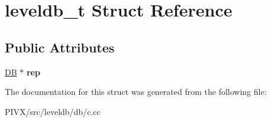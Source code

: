 \hypertarget{structleveldb__t}{}\section{leveldb\+\_\+t Struct Reference}
\label{structleveldb__t}
\subsection*{Public Attributes}
\begin{DoxyCompactItemize}
\item 
\mbox{\label{structleveldb__t_af8f1950b2c676ccc37e4095f558261ad}} 
\mbox{\hyperlink{classleveldb_1_1_d_b}{DB}} $\ast$ {\bfseries rep}
\end{DoxyCompactItemize}


The documentation for this struct was generated from the following file\+:\begin{DoxyCompactItemize}
\item 
P\+I\+V\+X/src/leveldb/db/c.\+cc\end{DoxyCompactItemize}
